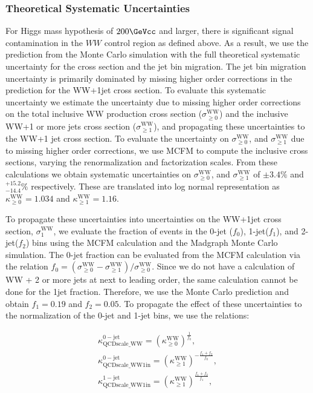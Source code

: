 \subsubsection{Theoretical Systematic Uncertainties} 
For Higgs mass hypothesis of $200\GeVcc$ and larger, there is significant signal contamination in 
the $WW$ control region as defined above. As a result, we use the prediction from the Monte Carlo
simulation with the full theoretical systematic uncertainty for the cross section and the 
jet bin migration. The jet bin migration uncertainty is primarily dominated by missing higher
order corrections in the prediction for the WW+1jet cross section. To evaluate this systematic 
uncertainty we estimate the uncertainty due to missing higher order corrections on the
total inclusive WW production cross section ($\sigma^{\mathrm{WW}}_{\geq 0}$) and the inclusive 
WW+1 or more jets cross section ($\sigma^{\mathrm{WW}}_{\geq 1}$), and propagating these uncertainties 
to the WW+1 jet cross section. To evaluate the uncertainty on 
$\sigma^{\mathrm{WW}}_{\geq 0}$, and $\sigma^{\mathrm{WW}}_{\geq 1}$ due to missing higher 
order corrections, we use MCFM \cite{MCFMVVProduction} to compute the inclusive cross sections, 
varying the renormalization and factorization scales. From these calculations we obtain 
systematic uncertainties on $\sigma^{\mathrm{WW}}_{\geq 0}$, and 
$\sigma^{\mathrm{WW}}_{\geq 1}$ of $\pm 3.4\%$ and $^{+15.2}_{-14.4} \%$ respectively. These are translated into
log normal representation as $\kappa^{\mathrm{WW}}_{\geq 0} = 1.034$ and $\kappa^{\mathrm{WW}}_{\geq 1} = 1.16$.

To propagate these uncertainties into uncertainties on the WW+1jet cross section, $\sigma^{\mathrm{WW}}_{1}$,
we evaluate the fraction of events in the 0-jet ($f_{0}$), 1-jet($f_{1}$), and 2-jet($f_{2}$) 
bins using the MCFM calculation and the Madgraph Monte Carlo simulation. The 0-jet fraction can be 
evaluated from the MCFM calculation via the relation 
$f_{0} = (\sigma^{\mathrm{WW}}_{\geq 0} - \sigma^{\mathrm{WW}}_{\geq 1}) / \sigma^{\mathrm{WW}}_{\geq 0}$.
Since we do not have a calculation of WW + 2 or more jets at next to leading order, the same calculation 
cannot be done for the  1jet fraction. Therefore, we use the Monte Carlo prediction and obtain 
$f_{1} = 0.19$ and $f_{2} = 0.05$. To propagate the effect of these uncertainties to the 
normalization of the 0-jet and 1-jet bins, we use the relations:

\begin{eqnarray}
\label{eqn:WWJetBinFractions}
\kappa^{\mathrm{0-jet}}_{\mathrm{QCDscale\_WW}} = (\kappa^{\mathrm{WW}}_{\geq 0})^{\frac{1}{f_{0}}},                 \\
\kappa^{\mathrm{0-jet}}_{\mathrm{QCDscale\_WW1in}} = (\kappa^{\mathrm{WW}}_{\geq 1})^{- \frac{f_{1}+f_{2}}{f_{0}}},  \\
\kappa^{\mathrm{1-jet}}_{\mathrm{QCDscale\_WW1in}} = (\kappa^{\mathrm{WW}}_{\geq 1})^{\frac{f_{1}+f_{2}}{f_{1}}},    \\
\end{eqnarray}

